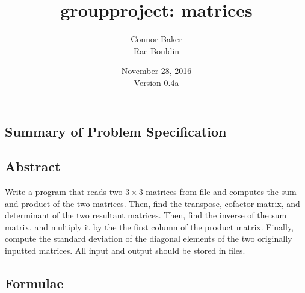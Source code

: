 \documentclass[12pt]{article}
\begin{document}
\null
\nointerlineskip 
\vfill
\let \snewpage \newpage
\let \newpage \relax
    \title{groupproject: matrices}
    \author{Connor Baker\\Rae Bouldin}
    \date{November 28, 2016\\Version 0.4a}
\maketitle
\let \newpage \snewpage
\vfill
\thispagestyle{empty}



\newpage %



\makeatletter
{}
\makeatother
\tableofcontents

\clearpage
{}

\begin{center}
\section{Summary of Problem Specification}
\end{center}
\subsection{Abstract}
Write a program that reads two $3\times3$ matrices from file and computes the sum and product of the two matrices. Then, find the transpose, cofactor matrix, and determinant of the two resultant matrices. Then, find the inverse of the sum matrix, and multiply it by the the first column of the product matrix. Finally, compute the standard deviation of the diagonal elements of the two originally inputted matrices.
All input and output should be stored in files.



\newpage %



\begin{center}
\section{Formulae}
\end{center}
\end{document}
